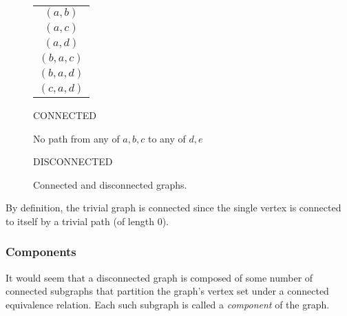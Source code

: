 \begin{figure}[H]
  \begin{minipage}[t]{2.75in}
    \centering

    \bigskip

    \begin{tabular}{c}
      \((a,b)\) \\
      \((a,c)\) \\
      \((a,d)\) \\
      \((b,a,c)\) \\
      \((b,a,d)\) \\
      \((c,a,d)\)
    \end{tabular}

    \bigskip
    
    CONNECTED
  \end{minipage}
  \begin{minipage}[t]{3in}
    \centering

    \bigskip
    
    No path from any of \(a,b,c\) to any of \(d,e\)

    \bigskip

    DISCONNECTED
  \end{minipage}
  \caption{Connected and disconnected graphs.}
  \label{fig:connect}
\end{figure}

By definition, the trivial graph is connected since the single vertex is connected to itself by a trivial path (of
length \(0\)).

\subsubsection{Components}\label{sec:sub:sub:components}

It would seem that a disconnected graph is composed of some number of connected subgraphs that partition the
graph's vertex set under a connected equivalence relation.  Each such subgraph is called a \emph{component} of the
graph.

